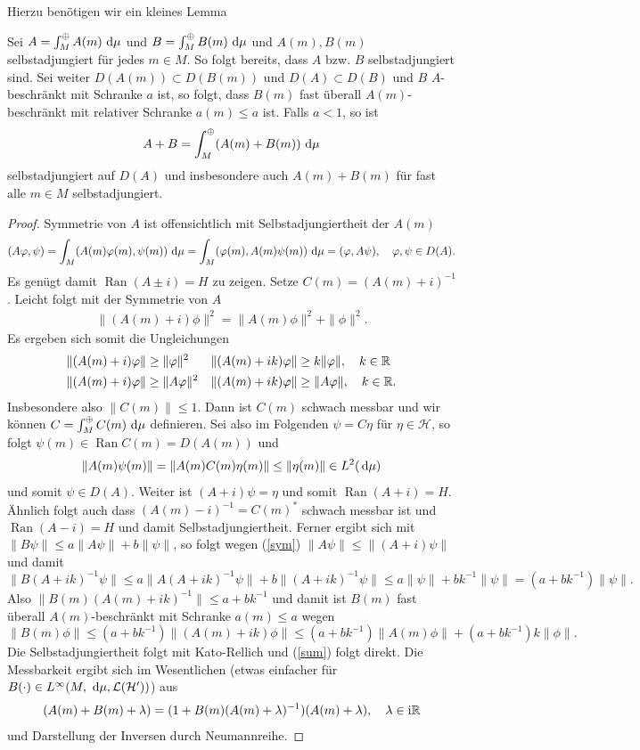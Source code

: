 \documentclass{mywork}
\DeclareMathOperator*{\Ran}{Ran}
\renewcommand{\eqref}[1]{(\ref{#1})}
\begin{document}
Hierzu benötigen wir ein kleines Lemma
\begin{lem}\label{kato}
Sei $A=\int_{M}^\oplus A(m) \, \dx[\mu]$ und $B=\int_{M}^\oplus B(m)\, \dx[\mu]$ und $A(m), B(m)$ selbstadjungiert für jedes $m\in M$. So folgt bereits, dass $A$ bzw. $B$ selbstadjungiert sind. Sei weiter $D(A(m))\subset D(B(m))$ und $D(A) \subset D(B)$ und  $B$ $A$-beschränkt mit Schranke $a$ ist, so folgt, dass $B(m)$ fast überall $A(m)$-beschränkt  mit relativer Schranke $a(m)\le a$ ist. Falls $a<1$, so ist
\begin{align} \label{sum}
A+B = \int_M^\oplus (A(m)+B(m))\, \dx[\mu]
\end{align}
selbstadjungiert auf $D(A)$ und insbesondere auch $A(m)+B(m)$ für fast alle $m\in M$ selbstadjungiert.  
\end{lem}
\begin{proof}
Symmetrie von $A$ ist offensichtlich mit Selbstadjungiertheit der $A(m)$
\[
(A\phi, \psi) =  \int_M (A(m) \phi(m), \psi(m))\, \dx[\mu] = \int_M (\phi(m), A(m) \psi(m))\, \dx[\mu]= (\phi, A\psi), \quad \phi, \psi \in D(A).
\]
Es genügt damit $\Ran(A\pm i)=H$ zu zeigen.  Setze $C(m)= (A(m)+i)^{-1}$. Leicht folgt mit der Symmetrie von $A$
\begin{align}\label{sym}
\| (A(m)+i)\phi\|^2 = \| A(m)\phi\|^2 + \| \phi\|^2.
\end{align}
Es ergeben sich somit die Ungleichungen
\begin{align*}
\| (A(m) +i)\phi\| &\ge \| \phi\|^2 &  \|(A(m)+ik)\phi\|&\ge k \|\phi\|, \quad k\in \R\\
\| (A(m) +i)\phi\| &\ge \| A\phi\|^2 &  \|(A(m)+ik)\phi\|&\ge \|A\phi\|, \quad k\in \R.
\end{align*}
Insbesondere also $\|C(m)\|\le 1$. Dann ist $C(m)$ schwach messbar und wir können $C=\int_M^\oplus C(m) \, \dx[\mu]$ definieren.  Sei also im Folgenden $\psi = C\eta$ für $\eta \in \mathcal H$, so folgt $\psi(m) \in \Ran C(m) = D(A(m))$ und
\[
\|A(m) \psi(m)\| = \|A(m) C(m) \eta(m)\| \le \| \eta(m)\| \in L^2(\dx[\mu])
\]
und somit $\psi\in D(A)$.  Weiter ist $(A+i)\psi = \eta$ und somit $\Ran(A+i)=H$. Ähnlich folgt auch dass $(A(m)-i)^{-1} = C(m)^*$ schwach messbar ist und $\Ran(A-i)=H$ und damit Selbstadjungiertheit. Ferner ergibt sich mit $\| B\psi\| \le a \| A\psi\| + b \| \psi\|$, so folgt wegen \eqref{sym} $\| A\psi\|\le \|(A+i)\psi\|$ und damit
\[
\| B(A+ik)^{-1}\psi\| \le a\| A(A+ik)^{-1}\psi\| + b \| (A+ik)^{-1} \psi\| 
\le a \| \psi\|+ bk^{-1} \| \psi\|
= (a+bk^{-1}) \| \psi\|.    
\]
Also $\| B(m) (A(m) +ik)^{-1}\| \le a+bk^{-1}$ und damit ist $B(m)$ fast überall $A(m)$-beschränkt mit Schranke $a(m) \le a$ wegen
\[
\|B(m) \phi\| \le (a+bk^{-1}) \| (A(m) +ik)\phi\| \le (a+bk^{-1}) \| A(m) \phi\| + (a+bk^{-1})k \| \phi\|.
\]
Die Selbstadjungiertheit folgt mit Kato-Rellich und \eqref{sum} folgt direkt. Die Messbarkeit ergibt sich im Wesentlichen (etwas einfacher für $B(\cdot)\in L^\infty(M, \, \dx[\mu], \mathcal L(\mathcal H'))$) aus
\begin{align}\label{trick}
(A(m)+B(m)+\lambda) = (1+ B(m)(A(m)+\lambda)^{-1})(A(m)+ \lambda), \quad \lambda \in \mathrm i \R
\end{align}
und Darstellung der Inversen durch Neumannreihe. 
\end{proof}
\end{document}
